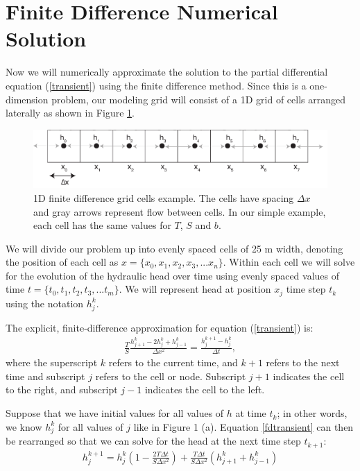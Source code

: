 \documentclass[11pt, oneside]{article}   	%
\begin{document}
\section*{Finite Difference Numerical Solution}

Now we will numerically approximate the solution to the partial differential equation (\ref{transient}) using the finite difference method.  Since this is a one-dimension problem, our modeling grid will consist of a 1D grid of cells arranged laterally as shown in Figure \ref{grid}.
%
\begin{figure}[tb]
\begin{center}
\includegraphics[width=.75\textwidth]{grid.pdf}
\caption{1D finite difference grid cells example.  The cells have spacing $\Delta x$ and gray arrows represent flow between cells. In our simple example, each cell has the same values for $T$, $S$ and $b$.  }
\label{grid}
\end{center}
\end{figure}
 
We will divide our problem up into evenly spaced cells of 25 m width, denoting the position of each cell as $x = \{x_0, x_1, x_2, x_3, ... x_n\}$.   Within each cell we will solve for the evolution of the hydraulic head over time using evenly spaced values of time $t = \{t_0, t_1, t_2, t_3, ... t_m\}$.  We will represent head at position $x_j$ time step $t_k$ using the notation $h_j^k$. 


The explicit, finite-difference approximation for equation (\ref{transient}) is:
\begin{eqnarray}
\frac{T}{S}\frac{h^k_{j+1}-2 h^k_{j} + h^k_{j-1} }{\Delta x^2} = \frac{h_j^{k+1}-h_j^k }{\Delta t},
\label{fdtransient}
\end{eqnarray}
where the superscript $k$ refers to the current time, and $k+1$ refers to the next time and subscript $j$ refers to the cell or node. Subscript $j+1$ indicates the cell to the right, and subscript $j-1$ indicates the cell to the left.  

Suppose that we have initial values for all values of $h$ at time $t_k$; in other words, we know $h_j^k$ for all values of $j$ like in Figure 1 (a). Equation \ref{fdtransient} can then be rearranged so that we can solve for the head at the next time step $t_{k+1}$:
\begin{eqnarray}
h_j^{k+1} = h_j^{k} \left ( 1 - \frac{2T\Delta t}{S\Delta x^2} \right) +  \frac{T\Delta t}{S\Delta x^2} \left( h_{j+1}^{k} + h_{j-1}^{k} \right)
\label{fdtransient_step}
\end{eqnarray}
\end{document}

